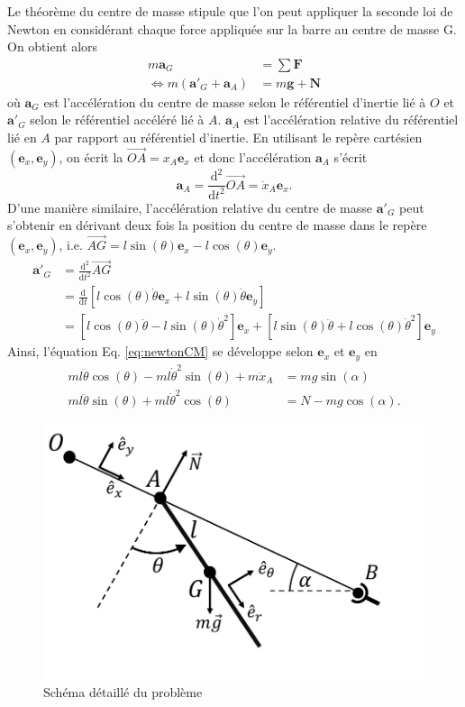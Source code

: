 \documentclass[11pt,a4paper]{exam}
\newcommand{\exACDH}{\bm e_x}
\newcommand{\eyACDH}{\bm e_y}
\begin{document}
\begin{parts}
    Le théorème du centre de masse stipule que l'on peut appliquer la seconde loi de Newton en considérant chaque force appliquée sur la barre au centre de masse G.
    On obtient alors 
    \begin{align}
        m \bm a_G &= \sum \bm F \nonumber\\
        \Leftrightarrow m (\bm a'_G + \bm a_A) &= m\bm g + \bm N \label{eq:newtonCM}
    \end{align}
    o\`u $\bm a_G$ est l'accélération du centre de masse selon le référentiel d'inertie lié à $O$ et $\bm a'_G$ selon le référentiel accéléré lié à $A$. $\bm a_A$ est l'accélération relative du référentiel lié en $A$ par rapport au référentiel d'inertie.
    En utilisant le repère cartésien $(\exACDH,\eyACDH)$, on écrit la $\overrightarrow{OA}=x_A \exACDH$ et donc l'accélération $\bm a_A$ s'écrit
    \begin{equation}
        \bm a_A = \frac{\mathrm d^2}{\mathrm dt^2}\overrightarrow{OA}= \ddot x_A \exACDH.
    \end{equation}
    D'une manière similaire, l'accélération relative du centre de masse $\bm a'_G$ peut s'obtenir en dérivant deux fois la position du centre de masse dans le repère $(\exACDH,\eyACDH)$, i.e. $\overrightarrow{AG}=l\sin(\theta)\exACDH-l\cos(\theta)\eyACDH$.
    \begin{align}
        \bm a'_G &= \frac{\mathrm d^2}{\mathrm dt^2}\overrightarrow{AG}\nonumber\\
        &= \frac{\mathrm d}{\mathrm dt}\left[l\cos(\theta)\dot\theta \exACDH + l\sin(\theta)\dot\theta \eyACDH \right]\nonumber\\
        &= \left[l\cos(\theta)\ddot\theta  - l\sin(\theta)\dot\theta^2 \right]\exACDH +  \left[l\sin(\theta)\ddot\theta + l\cos(\theta)\dot\theta^2\right]\eyACDH
    \end{align}
    Ainsi, l'équation Eq. \eqref{eq:newtonCM} se développe selon $\exACDH$ et $\eyACDH$ en
    \begin{align}
    ml\ddot\theta\cos(\theta) - ml\dot\theta^2 \sin(\theta)  + m\ddot x_A &= m g \sin(\alpha)\label{eq:newton_ex}\\
    ml\ddot\theta\sin(\theta) +ml \dot\theta^2\cos(\theta) &= N - mg\cos(\alpha) \label{eq:newton_ey}.
    \end{align}
    
     \begin{figure}
         \centering
         \includegraphics[width=0.5\linewidth]{ExoFig/tyr_schema_details.pdf}
         \caption{Schéma détaillé du problème}
         \label{fig:schema_details}
     \end{figure}


\end{parts}
\end{document}
